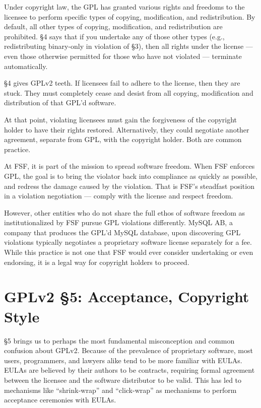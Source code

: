 Under copyright law, the GPL has granted various rights and freedoms to
the licensee to perform specific types of copying, modification, and
redistribution. By default, all other types of copying, modification, and
redistribution are prohibited. \S 4 says that if you undertake any of
those other types (e.g., redistributing binary-only in violation of \S 3),
then all rights under the license --- even those otherwise permitted for
those who have not violated --- terminate automatically.

\S 4 gives GPLv2 teeth. If licensees fail to adhere to the license, then
they are stuck. They must completely cease and desist from all
copying, modification and distribution of that GPL'd software.

At that point, violating licensees must gain the forgiveness of the
copyright holder to have their rights restored. Alternatively, they could
negotiate another agreement, separate from GPL, with the copyright
holder. Both are common practice.

At FSF, it is part of the mission to spread software freedom. When FSF
enforces GPL, the goal is to bring the violator back into compliance as
quickly as possible, and redress the damage caused by the violation.
That is FSF's steadfast position in a violation negotiation --- comply
with the license and respect freedom.

However, other entities who do not share the full ethos of software
freedom as institutionalized by FSF pursue GPL violations differently.
MySQL AB, a company that produces the GPL'd MySQL database, upon
discovering GPL violations typically negotiates a proprietary software
license separately for a fee. While this practice is not one that FSF
would ever consider undertaking or even endorsing, it is a legal way for
copyright holders to proceed.

\section{GPLv2 \S 5: Acceptance, Copyright Style}
\label{GPLs5}

\S 5 brings us to perhaps the most fundamental misconception and common
confusion about GPLv2\@. Because of the prevalence of proprietary software,
most users, programmers, and lawyers alike tend to be more familiar with
EULAs. EULAs are believed by their authors to be contracts, requiring
formal agreement between the licensee and the software distributor to be
valid. This has led to mechanisms like ``shrink-wrap'' and ``click-wrap''
as mechanisms to perform acceptance ceremonies with EULAs.

